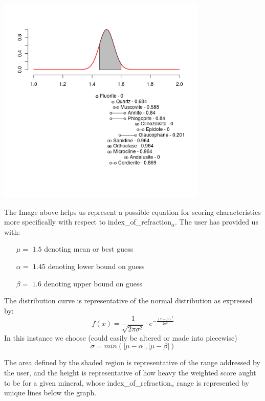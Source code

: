 \documentclass{article}
\def \ira{index\_of\_refraction$_\alpha$\xspace}
\begin{document}
\begin{center}
\includegraphics[width=100mm]{sample.png}
\end{center}
The Image above helps us represent a possible equation for scoring characteristics more specifically with respect to \ira. The user has provided us with:
\small
\begin{itemize}
\item[$\mu = $]$1.5$ denoting mean or best guess
\item[$\alpha =$]$1.45$ denoting lower bound on guess
\item[$\beta =$]$1.6$ denoting upper bound on guess
\end{itemize}
\normalsize

The distribution curve is representative of the normal distribution as expressed by:
\[f(x)=\frac{1}{\sqrt{2\pi\sigma^2}}\cdot e^{-\frac{(x-\mu)^2}{2\sigma^2}} \]
In this instance we choose (could easily be altered or made into piecewise)
\[\sigma=min(|\mu-\alpha|,|\mu-\beta|)\]

The area defined by the shaded region is representative of the range addressed by the user, and the height is representative of how heavy the weighted score aught to be for a given mineral, whose \ira range is represented by unique lines below the graph.
\end{document}
